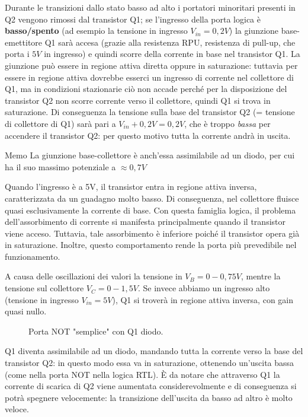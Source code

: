 \documentclass[
]{book}
\begin{document}
Durante le transizioni dallo stato basso ad alto i portatori minoritari
presenti in Q2 vengono rimossi dal transistor Q1; se l'ingresso della
porta logica è \textbf{basso/spento} (ad esempio la tensione in ingresso
\(V_{in}=0,2V\)) la giunzione base-emettitore Q1 sarà accesa (grazie
alla resistenza RPU, resistenza di pull-up, che porta i \(5V\) in
ingresso) e quindi scorre della corrente in base nel transistor Q1. La
giunzione può essere in regione attiva diretta oppure in saturazione:
tuttavia per essere in regione attiva dovrebbe esserci un ingresso di
corrente nel collettore di Q1, ma in condizioni stazionarie ciò non
accade perché per la disposizione del transistor Q2 non scorre corrente
verso il collettore, quindi Q1 si trova in saturazione. Di conseguenza
la tensione sulla base del transistor Q2 (= tensione di collettore di
Q1) sarà pari a \(V_{in}+0,2V=0,2V\), che è troppo \emph{bassa} per
accendere il transistor Q2: per questo motivo tutta la corrente andrà in
uscita.

\begin{greenbox}{Memo}
La giunzione base-collettore è anch'essa assimilabile ad un diodo, per cui ha il suo massimo potenziale a $\approx 0,7V$
\end{greenbox}

Quando l'ingresso è a 5V, il transistor entra in regione attiva inversa,
caratterizzata da un guadagno molto basso. Di conseguenza, nel
collettore fluisce quasi esclusivamente la corrente di base. Con questa
famiglia logica, il problema dell'assorbimento di corrente si manifesta
principalmente quando il transistor viene acceso. Tuttavia, tale
assorbimento è inferiore poiché il transistor opera già in saturazione.
Inoltre, questo comportamento rende la porta più prevedibile nel
funzionamento.

A causa delle oscillazioni dei valori la tensione in \(V_{B}=0-0,75V\),
mentre la tensione sul collettore \(V_{C}=0-1,5V\). Se invece abbiamo un
ingresso alto (tensione in ingresso \(V_{in}=5V\)), Q1 si troverà in
regione attiva inversa, con gain quasi nullo.

\begin{figure}[H]
    \centering
    \resizebox{0.4\textwidth}{!}{}
    \caption{Porta NOT "semplice" con Q1 diodo.}
\end{figure}

Q1 diventa assimilabile ad un diodo, mandando tutta la corrente verso la
base del transistor Q2: in questo modo essa va in saturazione, ottenendo
un'uscita bassa (come nella porta NOT nella logica RTL). È da notare che
attraverso Q1 la corrente di scarica di Q2 viene aumentata
considerevolmente e di conseguenza si potrà spegnere velocemente: la
transizione dell'uscita da basso ad altro è molto veloce.
\end{document}
